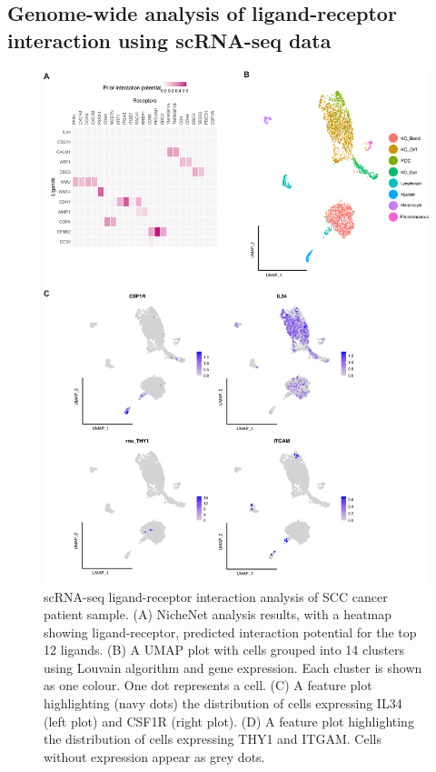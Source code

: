 \subsection{Genome-wide analysis of ligand-receptor interaction using scRNA-seq data}
\begin{figure}[htp]
\renewcommand{\figurename}{Figure}
    \centering
    \includegraphics[width=0.75\columnwidth]{Chapter2/Figures/Supplemental_Fig_S2.png}
    \caption[scRNA-seq ligand-receptor interaction analysis of SCC cancer patient sample. ]{scRNA-seq ligand-receptor interaction analysis of SCC cancer patient sample. (A) NicheNet analysis results, with a heatmap showing ligand-receptor, predicted interaction potential for the top 12 ligands. (B) A UMAP plot with cells grouped into 14 clusters using Louvain algorithm and gene expression. Each cluster is shown as one colour. One dot represents a cell. (C) A feature plot highlighting (navy dots) the distribution of cells expressing IL34 (left plot) and CSF1R (right plot). (D) A feature plot highlighting the distribution of cells expressing THY1 and ITGAM. Cells without expression appear as grey dots.}
    \label{fig:Chap2_Supfigure2}
\end{figure}


